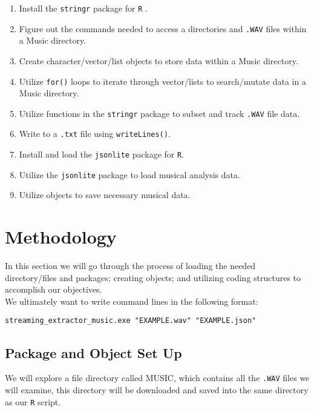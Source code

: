 \documentclass{article}\usepackage[]{graphicx}\usepackage[]{xcolor}
\begin{document}
\begin{multicols}{2}
\begin{enumerate}
  \item Install the \texttt{stringr} package for \texttt{R} \citep{stringr}. 
  \item Figure out the commands needed to access a directories and \texttt{.WAV} files 
  within a Music directory. 
  \item Create character/vector/list objects to store data within a Music
  directory.
  \item Utilize \texttt{for()} loops to iterate through vector/lists
  to search/mutate data in a Music directory. 
  \item Utilize functions in the \texttt{stringr} package to subset
  and track \texttt{.WAV} file data. 
  \item Write to a \texttt{.txt} file using \texttt{writeLines()}. 
  \item Install and load the \texttt{jsonlite} package for \texttt{R}.
  \item Utilize the \texttt{jsonlite} package to load musical analysis
  data. \citep{jsonlite}
  \item Utilize objects to save necessary musical data.
\end{enumerate}

\section{Methodology}
In this section we will go through the process of loading the needed directory/files and 
packages; creating objects; and utilizing coding structures to accomplish our objectives. \\

We ultimately want to write command lines in the following format: 
\begin{center}
\begin{footnotesize}
  \texttt{streaming}\verb|_|\texttt{extractor}\verb|_|\texttt{music.exe "EXAMPLE.wav" "EXAMPLE.json"}
\end{footnotesize}
\end{center}

\subsection{Package and Object Set Up}
We will explore a file directory called MUSIC, which contains all the \texttt{.WAV} files we will
examine, this directory will be downloaded and saved into the same directory as our \texttt{R} script.


\end{multicols}
\end{document}
